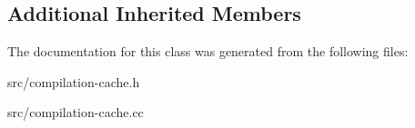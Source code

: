 \subsection*{Additional Inherited Members}


The documentation for this class was generated from the following files\+:\begin{DoxyCompactItemize}
\item 
src/compilation-\/cache.\+h\item 
src/compilation-\/cache.\+cc\end{DoxyCompactItemize}
